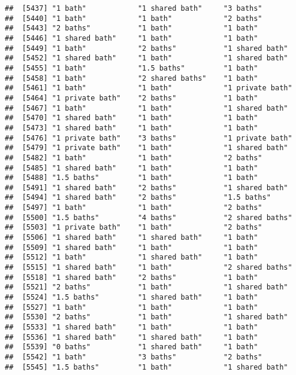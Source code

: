 \documentclass[
]{article}
\begin{document}
\begin{verbatim}
##  [5437] "1 bath"            "1 shared bath"     "3 baths"          
##  [5440] "1 bath"            "1 bath"            "2 baths"          
##  [5443] "2 baths"           "1 bath"            "1 bath"           
##  [5446] "1 shared bath"     "1 bath"            "1 bath"           
##  [5449] "1 bath"            "2 baths"           "1 shared bath"    
##  [5452] "1 shared bath"     "1 bath"            "1 shared bath"    
##  [5455] "1 bath"            "1.5 baths"         "1 bath"           
##  [5458] "1 bath"            "2 shared baths"    "1 bath"           
##  [5461] "1 bath"            "1 bath"            "1 private bath"   
##  [5464] "1 private bath"    "2 baths"           "1 bath"           
##  [5467] "1 bath"            "1 bath"            "1 shared bath"    
##  [5470] "1 shared bath"     "1 bath"            "1 bath"           
##  [5473] "1 shared bath"     "1 bath"            "1 bath"           
##  [5476] "1 private bath"    "3 baths"           "1 private bath"   
##  [5479] "1 private bath"    "1 bath"            "1 shared bath"    
##  [5482] "1 bath"            "1 bath"            "2 baths"          
##  [5485] "1 shared bath"     "1 bath"            "1 bath"           
##  [5488] "1.5 baths"         "1 bath"            "1 bath"           
##  [5491] "1 shared bath"     "2 baths"           "1 shared bath"    
##  [5494] "1 shared bath"     "2 baths"           "1.5 baths"        
##  [5497] "1 bath"            "1 bath"            "2 baths"          
##  [5500] "1.5 baths"         "4 baths"           "2 shared baths"   
##  [5503] "1 private bath"    "1 bath"            "2 baths"          
##  [5506] "1 shared bath"     "1 shared bath"     "1 bath"           
##  [5509] "1 shared bath"     "1 bath"            "1 bath"           
##  [5512] "1 bath"            "1 shared bath"     "1 bath"           
##  [5515] "1 shared bath"     "1 bath"            "2 shared baths"   
##  [5518] "1 shared bath"     "2 baths"           "1 bath"           
##  [5521] "2 baths"           "1 bath"            "1 shared bath"    
##  [5524] "1.5 baths"         "1 shared bath"     "1 bath"           
##  [5527] "1 bath"            "1 bath"            "1 bath"           
##  [5530] "2 baths"           "1 bath"            "1 shared bath"    
##  [5533] "1 shared bath"     "1 bath"            "1 bath"           
##  [5536] "1 shared bath"     "1 shared bath"     "1 bath"           
##  [5539] "0 baths"           "1 shared bath"     "1 bath"           
##  [5542] "1 bath"            "3 baths"           "2 baths"          
##  [5545] "1.5 baths"         "1 bath"            "1 shared bath"    

\end{verbatim}
\end{document}
